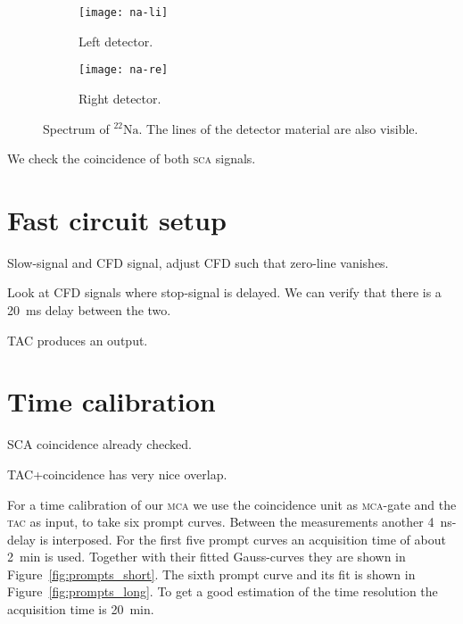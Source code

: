 \documentclass[11pt, english, fleqn, DIV=15, headinclude, BCOR=2cm]{scrreprt}
\begin{document}
\begin{figure}
        \centering
        \begin{subfigure}[c]{.49\linewidth}
                \centering
                \texttt{[image: na-li]}
                \caption{%
                        Left detector.
                }
                \label{fig:na-li}
        \end{subfigure}
        \hfill
        \begin{subfigure}[c]{.49\linewidth}
                \centering
                \texttt{[image: na-re]}
                \caption{%
                        Right detector.
                }
                \label{fig:na-re}
        \end{subfigure}
        \caption{%
                Spectrum of ${}^{22}\text{Na}$. The lines of the detector
                material are also visible.
        }
        \label{fig:natrium}
\end{figure}


We check the coincidence of both \textsc{sca} signals.

\section{Fast circuit setup}

Slow-signal and CFD signal, adjust CFD such that zero-line vanishes.

Look at CFD signals where stop-signal is delayed. We can verify that there is a
\SI{20}{\milli\second} delay between the two.

TAC produces an output.

\section{Time calibration}

SCA coincidence already checked.

TAC+coincidence has very nice overlap.

For a time calibration of our \textsc{mca} we use the coincidence unit as
\textsc{mca}-gate and the \textsc{tac} as input, to take six prompt curves.
Between the measurements another \SI{4}{\nano\second}-delay is interposed. For
the first five prompt curves an acquisition time of about \SI{2}{\minute} is
used.  Together with their fitted Gauss-curves they are shown in
Figure~\ref{fig:prompts_short}. The sixth prompt curve and its fit is shown in
Figure~\ref{fig:prompts_long}. To get a good estimation of the time resolution
the acquisition time is \SI{20}{\minute}.
\end{document}
